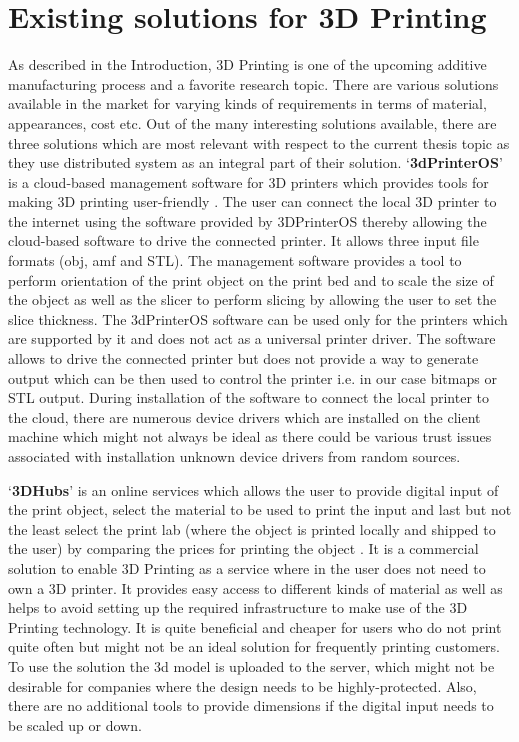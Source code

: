 \section{Existing solutions for 3D Printing}

As described in the Introduction, 3D Printing is one of the upcoming additive manufacturing process and a favorite research topic. There are various solutions available in the market for varying kinds of requirements in terms of material, appearances, cost etc. Out of the many interesting solutions available, there are three solutions which are most relevant with respect to the current thesis topic as they use distributed system as an integral part of their solution. {\lq}\textbf{3dPrinterOS}{\rq} is a cloud-based management software for 3D printers which provides tools for making 3D printing user-friendly \cite{3dprinteros}. The user can connect the local 3D printer to the internet using the software provided by 3DPrinterOS thereby allowing the cloud-based software to drive the connected printer. It allows three input file formats (obj, amf and STL). The management software provides a tool to perform orientation of the print object on the print bed and to scale the size of the object as well as the slicer to perform slicing by allowing the user to set the slice thickness. The 3dPrinterOS software can be used only for the printers which are supported by it and does not act as a universal printer driver. The software allows to drive the connected printer but does not provide a way to generate output which can be then used to control the printer i.e. in our case bitmaps or STL output. During installation of the software to connect the local printer to the cloud, there are numerous device drivers which are installed on the client machine which might not always be ideal as there could be various trust issues associated with installation unknown device drivers from random sources. \newline

{\lq}\textbf{3DHubs}{\rq} is an online services which allows the user to provide digital input of the print object, select the material to be used to print the input and last but not the least select the print lab (where the object is printed locally and shipped to the user) by comparing the prices for printing the object \cite{3dhub}. It is a commercial solution to enable 3D Printing as a service where in the user does not need to own a 3D printer. It provides easy access to different kinds of material as well as helps to avoid setting up the required infrastructure to make use of the 3D Printing technology. It is quite beneficial and cheaper for users who do not print quite often but might not be an ideal solution for frequently printing customers. To use the solution the 3d model is uploaded to the server, which might not be desirable for companies where the design needs to be highly-protected. Also, there are no additional tools to provide dimensions if the digital input needs to be scaled up or down. \newline     

